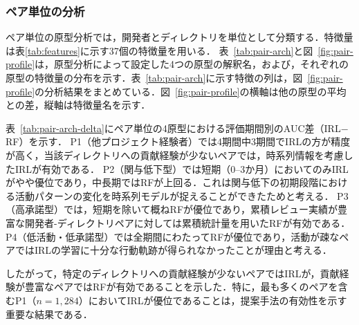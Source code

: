 \documentclass[submit,noauthor,ses,dvipdfmx]{ipsj}
\newcommand{\todo}[1]{\colorbox{yellow}{{\bf TODO}:}{\color{red} {\textbf{[#1]}}}}
\begin{document}
\subsubsection{ペア単位の分析}\label{sec:pair-arch}

ペア単位の原型分析では，開発者とディレクトリを単位として分類する．特徴量は表\ref{tab:features}に示す37個の特徴量を用いる．
表~\ref{tab:pair-arch}と図~\ref{fig:pair-profile}は，原型分析によって設定した4つの原型の解釈名，および，それぞれの原型の特徴量の分布を示す．表~\ref{tab:pair-arch}に示す特徴の列は，図~\ref{fig:pair-profile}の分析結果をまとめている．図~\ref{fig:pair-profile}の横軸は他の原型の平均との差，縦軸は特徴量名を示す．

表~\ref{tab:pair-arch-delta}にペア単位の4原型における評価期間別のAUC差（IRL$-$RF）を示す．
P1（他プロジェクト経験者）では4期間中3期間でIRLの方が精度が高く，当該ディレクトリへの貢献経験が少ないペアでは，時系列情報を考慮したIRLが有効である．
P2（関与低下型）では短期（0--3か月）においてのみIRLがやや優位であり，中長期ではRFが上回る．これは関与低下の初期段階における活動パターンの変化を時系列モデルが捉えることができたためと考える．
P3（高承諾型）では，短期を除いて概ねRFが優位であり，累積レビュー実績が豊富な開発者-ディレクトリペアに対しては累積統計量を用いたRFが有効である．
P4（低活動・低承諾型）では全期間にわたってRFが優位であり，活動が疎なペアではIRLの学習に十分な行動軌跡が得られなかったことが理由と考える．

したがって，特定のディレクトリへの貢献経験が少ないペアではIRLが，貢献経験が豊富なペアではRFが有効であることを示した．特に，最も多くのペアを含むP1（$n = 1{,}284$）においてIRLが優位であることは，提案手法の有効性を示す重要な結果である．




\end{document}
